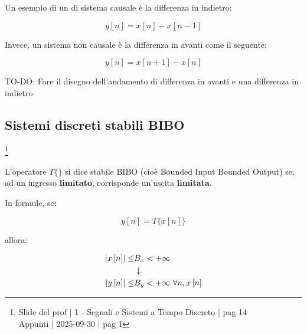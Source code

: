 Un esempio di un di sistema causale è la differenza in indietro: 

{
    \Large 
    \begin{equation}
        y \left[ n\right] 
        = 
        x \left[n\right]
        - 
        x \left[n - 1\right]
    \end{equation}
}

Invece, un sistema non causale è la differenza in avanti come il seguente: 

{
    \Large 
    \begin{equation}
        y \left[ n\right] 
        = 
        x \left[n + 1\right]
        - 
        x \left[n \right]
    \end{equation}
}

\begin{tcolorbox}[colback=green!5!white,colframe=green!75!black]
TO-DO: Fare il disegno dell'andamento di differenza in avanti e una differenza in indietro 
\end{tcolorbox} 

\newpage 

\subsection{Sistemi discreti stabili BIBO}

\footnote{ 
    Slide del prof | 1 - Segnali e Sistemi a Tempo Discreto | pag 14\\
    Appunti | 2025-09-30 | pag 1
}

L'operatore $T \{ \}$ si dice stabile BIBO (cioè Bounded Input Bounded Output) 
se, ad un ingresso \textbf{limitato}, corrisponde un'uscita \textbf{limitata}. \newline 

In formule, se: 

{
    \Large 
    \begin{equation}
        y \left[ n \right]
        = 
        T \{ x \left[ n\right]\}
    \end{equation}
}

allora: 

{
    \Large 
    \begin{equation}
        \begin{split}
            \abs{x \left[ n\right]} 
            \leq
            &B_x 
            < 
            + \infty
            \\
            &\downarrow
            \\
            \abs{y \left[ n\right]} 
            \leq
            &B_y 
            < 
            + \infty
            \text{ }
            \forall n, x \left[ n\right]
        \end{split}
    \end{equation}
}

